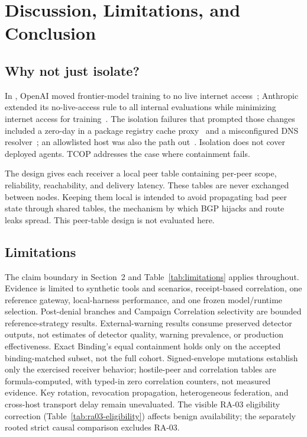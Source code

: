 \section{Discussion, Limitations, and Conclusion}

\subsection{Why not just isolate?}

In \CaseIsolationMonth{}, OpenAI moved frontier-model training to no live internet access~\cite{caseOpenaiIsolation}; Anthropic extended its no-live-access rule to all internal evaluations while minimizing internet access for training~\cite{caseAnthropicIsolation}. The isolation failures that prompted those changes included a zero-day in a package registry cache proxy~\cite{openaiHfIncident} and a misconfigured DNS resolver~\cite{caseOpenaiIsolation}; an allowlisted host was also the path out~\cite{caseFrontierKimi}. Isolation does not cover deployed agents. TCOP addresses the case where containment fails.

The design gives each receiver a local peer table containing per-peer scope, reliability, reachability, and delivery latency. These tables are never exchanged between nodes. Keeping them local is intended to avoid propagating bad peer state through shared tables, the mechanism by which BGP hijacks and route leaks spread. This peer-table design is not evaluated here.

\subsection{Limitations}

The claim boundary in Section~2 and Table~\ref{tab:limitations} applies throughout. Evidence is limited to synthetic tools and scenarios, receipt-based correlation, one reference gateway, local-harness performance, and one frozen model/runtime selection. Post-denial branches and Campaign Correlation selectivity are bounded reference-strategy results. External-warning results consume preserved detector outputs, not estimates of detector quality, warning prevalence, or production effectiveness. Exact Binding's equal containment holds only on the accepted binding-matched subset, not the full cohort. Signed-envelope mutations establish only the exercised receiver behavior; hostile-peer and correlation tables are formula-computed, with typed-in zero correlation counters, not measured evidence. Key rotation, revocation propagation, heterogeneous federation, and cross-host transport delay remain unevaluated. The visible RA-03 eligibility correction (Table~\ref{tab:ra03-eligibility}) affects benign availability; the separately rooted strict causal comparison excludes RA-03.

